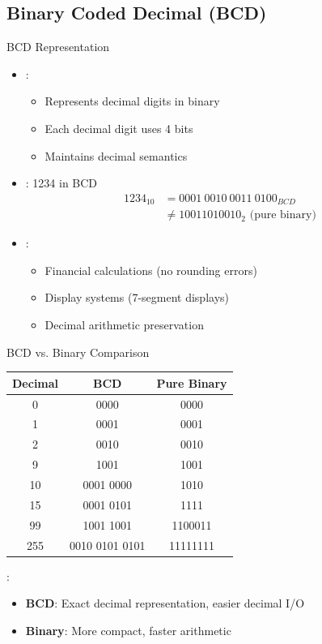 \subsection{Binary Coded Decimal (BCD)}

\begin{frame}{BCD Representation}
\begin{itemize}
\item {}:
\begin{itemize}
\item Represents decimal digits in binary
\item Each decimal digit uses 4 bits
\item Maintains decimal semantics
\end{itemize}
\vspace{0.5cm}
\item {}: 1234 in BCD
\begin{align}
1234_{10} &= 0001\ 0010\ 0011\ 0100_{BCD}\\
&\neq 10011010010_2 \text{ (pure binary)}
\end{align}
\vspace{0.3cm}
\item {}:
\begin{itemize}
\item Financial calculations (no rounding errors)
\item Display systems (7-segment displays)
\item Decimal arithmetic preservation
\end{itemize}
\end{itemize}
\end{frame}

\begin{frame}{BCD vs. Binary Comparison}
\begin{center}
\begin{tabular}{|c|c|c|}
\hline
\textbf{Decimal} & \textbf{BCD} & \textbf{Pure Binary} \\
\hline
0 & 0000 & 0000 \\
1 & 0001 & 0001 \\
2 & 0010 & 0010 \\
9 & 1001 & 1001 \\
10 & 0001 0000 & 1010 \\
15 & 0001 0101 & 1111 \\
99 & 1001 1001 & 1100011 \\
255 & 0010 0101 0101 & 11111111 \\
\hline
\end{tabular}
\end{center}

\vspace{0.3cm}
:
\begin{itemize}
\item \textbf{BCD}: Exact decimal representation, easier decimal I/O
\item \textbf{Binary}: More compact, faster arithmetic
\end{itemize}
\end{frame}

